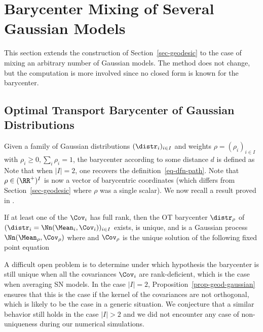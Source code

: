 \section{Barycenter Mixing of Several Gaussian Models}


This section extends the construction of Section~\ref{sec-geodesic} to the case of mixing an arbitrary number of Gaussian models. The method does not change, but the computation is more involved since no closed form is known for the barycenter. 

\subsection{Optimal Transport Barycenter of Gaussian Distributions}

Given a family of Gaussian distributions $( \distr_i )_{i \in I}$ and weights $\rho = (\rho_i)_{i \in I}$ with $\rho_i \geq 0, \sum_i \rho_i=1$, the barycenter according to some distance $d$ is defined as
Note that when $|I|=2$, one recovers the definition~\eqref{eq-dfn-path}. Note that $\rho \in (\RR^+)^{I}$ is now a vector of barycentric coordinates (which differs from Section~\ref{sec-geodesic} where $\rho$ was a single scalar). We now recall a result proved in \cite{Carlier_wasserstein_barycenter}.

\begin{proposition}\label{prop-bary-gaussian}
	If at least one of the $\Cov_{i}$ has full rank, then the OT barycenter $\distr_\rho$ of  $(\distr_i = \Nn(\Mean_i,\Cov_i))_{i \in I}$ exists, is unique, and is a Gaussian process $\Nn(\Mean_\rho,\Cov_\rho)$ where
	and $\Cov_\rho$ is the unique solution of the following fixed point equation
\end{proposition}

A difficult open problem is to determine under which hypothesis the barycenter is still unique when all the covariances $\Cov_i$ are rank-deficient, which is the case when averaging SN models. In the case $|I|=2$, Proposition~\ref{prop-geod-gaussian} ensures that this is the case if the kernel of the covariances are not orthogonal, which is likely to be the case in a generic situation. We conjecture that a similar behavior still holds in the case $|I|>2$ and we did not encounter any case of non-uniqueness during our numerical simulations. 



